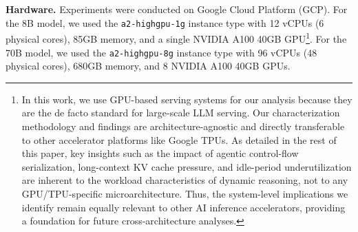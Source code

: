 \textbf{Hardware.}
Experiments were conducted on Google Cloud Platform (GCP). For the 8B model, we used the \texttt{a2-highgpu-1g} instance type with 12 vCPUs (6 physical cores), 85GB memory, and a single NVIDIA A100 40GB GPU\footnote{
In this work, we use GPU-based serving systems for our analysis because they are the de facto standard for large-scale LLM serving. Our characterization methodology and findings are architecture-agnostic and directly transferable to other accelerator platforms like Google TPUs. As detailed in the rest of this paper, key insights such as the impact of agentic control-flow serialization, long-context KV cache pressure, and idle-period underutilization are inherent to the workload characteristics of dynamic reasoning, not to any GPU/TPU-specific microarchitecture. Thus, the system-level implications we identify remain equally relevant to other AI inference accelerators, providing a foundation for future cross-architecture analyses.}. For the 70B model, we used the \texttt{a2-highgpu-8g} instance type with 96 vCPUs (48 physical cores), 680GB memory, and 8 NVIDIA A100 40GB GPUs.